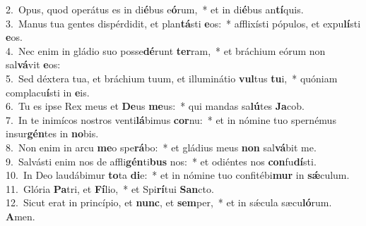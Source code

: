 {2.~}Opus, quod operátus es in di\textbf{é}bus e\textbf{ó}rum,~* et in di\textbf{é}bus an\textbf{tí}quis.\\
{3.~}Manus tua gentes dispérdidit, et plan\textbf{tá}sti \textbf{e}os:~* afflixísti pópulos, et expu\textbf{lí}sti \textbf{e}os.\\
{4.~}Nec enim in gládio suo posse\textbf{dé}runt \textbf{ter}ram,~* et bráchium eórum non sal\textbf{vá}vit \textbf{e}os:\\
{5.~}Sed déxtera tua, et bráchium tuum, et illuminátio \textbf{vul}tus \textbf{tu}i,~* quóniam complacu\textbf{í}sti in \textbf{e}is.\\
{6.~}Tu es ipse Rex meus et \textbf{De}us \textbf{me}us:~* qui mandas sa\textbf{lú}tes \textbf{Ja}cob.\\
{7.~}In te inimícos nostros venti\textbf{lá}bimus \textbf{cor}nu:~* et in nómine tuo spernémus insur\textbf{gén}tes in \textbf{no}bis.\\
{8.~}Non enim in arcu \textbf{me}o spe\textbf{rá}bo:~* et gládius meus \textbf{non} sal\textbf{vá}bit me.\\
{9.~}Salvásti enim nos de affli\textbf{gén}ti\textbf{bus} nos:~* et odiéntes nos \textbf{con}fu\textbf{dí}sti.\\
{10.~}In Deo laudábimur \textbf{to}ta \textbf{di}e:~* et in nómine tuo confitébi\textbf{mur} in \textbf{sǽ}culum.\\
{11.~}Glória \textbf{Pa}tri, et \textbf{Fí}lio,~* et Spi\textbf{rí}tui \textbf{San}cto.\\
{12.~}Sicut erat in princípio, et \textbf{nunc}, et \textbf{sem}per,~* et in sǽcula sæcu\textbf{ló}rum. \textbf{A}men.\\

